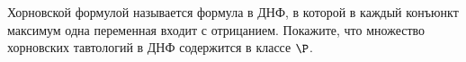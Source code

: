 Хорновской формулой называется формула в ДНФ, в которой в каждый конъюнкт максимум одна переменная входит с
отрицанием. Покажите, что множество хорновских тавтологий в ДНФ содержится в классе $\P$.